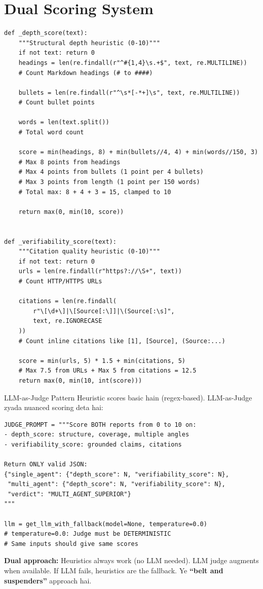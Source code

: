 \documentclass[11pt,a4paper,twoside]{report}
\begin{document}
\section{Dual Scoring System}

\begin{lstlisting}[style=pythonstyle,caption={evaluator.py --- Heuristic Scoring Functions}]
def _depth_score(text):
    """Structural depth heuristic (0-10)"""
    if not text: return 0
    headings = len(re.findall(r"^#{1,4}\s.+$", text, re.MULTILINE))
    # Count Markdown headings (# to ####)

    bullets = len(re.findall(r"^\s*[-*+]\s", text, re.MULTILINE))
    # Count bullet points

    words = len(text.split())
    # Total word count

    score = min(headings, 8) + min(bullets//4, 4) + min(words//150, 3)
    # Max 8 points from headings
    # Max 4 points from bullets (1 point per 4 bullets)
    # Max 3 points from length (1 point per 150 words)
    # Total max: 8 + 4 + 3 = 15, clamped to 10

    return max(0, min(10, score))


def _verifiability_score(text):
    """Citation quality heuristic (0-10)"""
    if not text: return 0
    urls = len(re.findall(r"https?://\S+", text))
    # Count HTTP/HTTPS URLs

    citations = len(re.findall(
        r"\[\d+\]|\[Source[:\]]|\(Source[:\s]",
        text, re.IGNORECASE
    ))
    # Count inline citations like [1], [Source], (Source:...)

    score = min(urls, 5) * 1.5 + min(citations, 5)
    # Max 7.5 from URLs + Max 5 from citations = 12.5
    return max(0, min(10, int(score)))
\end{lstlisting}

\begin{conceptbox}{LLM-as-Judge Pattern}
Heuristic scores basic hain (regex-based). LLM-as-Judge zyada nuanced scoring deta hai:

\begin{lstlisting}[style=pythonstyle]
JUDGE_PROMPT = """Score BOTH reports from 0 to 10 on:
- depth_score: structure, coverage, multiple angles
- verifiability_score: grounded claims, citations

Return ONLY valid JSON:
{"single_agent": {"depth_score": N, "verifiability_score": N},
 "multi_agent": {"depth_score": N, "verifiability_score": N},
 "verdict": "MULTI_AGENT_SUPERIOR"}
"""

llm = get_llm_with_fallback(model=None, temperature=0.0)
# temperature=0.0: Judge must be DETERMINISTIC
# Same inputs should give same scores
\end{lstlisting}

\textbf{Dual approach:} Heuristics always work (no LLM needed). LLM judge augments when available. If LLM fails, heuristics are the fallback. Ye \textbf{``belt and suspenders''} approach hai.
\end{conceptbox}
\end{document}

